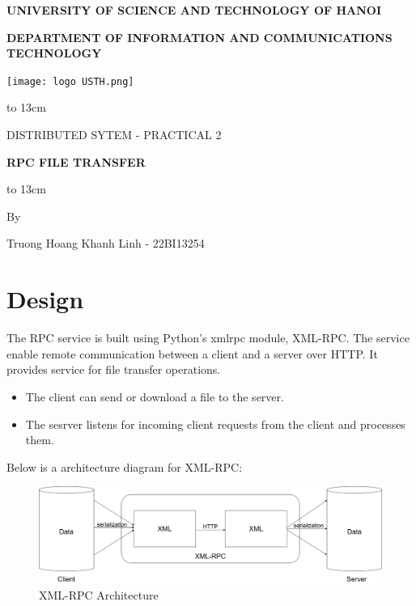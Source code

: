 \documentclass[12pt]{article}
\begin{document}
\begin{titlepage}
   \begin{center}

       \textbf{UNIVERSITY OF SCIENCE AND TECHNOLOGY OF HANOI}

       \footnotesize{\textbf{DEPARTMENT OF INFORMATION AND COMMUNICATIONS TECHNOLOGY}}
       
       \texttt{[image: logo USTH.png]}
            
       \vspace{6cm}
       
       \centerline{\hbox to 13cm{\hrulefill}}
       \vspace{-0.1cm}
       {\sc 
       \uppercase{{Distributed Sytem - Practical 2}}

       \vspace{0.1cm}

       \LARGE
       \uppercase{{\textbf{RPC File Transfer}}}}
       \centerline{\hbox to 13cm{\hrulefill}}

       \vspace{9cm}

       By

       Truong Hoang Khanh Linh - 22BI13254
            
   \end{center}
\end{titlepage}

\section{Design}

The RPC service is built using Python’s xmlrpc module, XML-RPC. The service enable remote communication between a client and a server over HTTP. It provides service for file transfer operations.
\begin{itemize}
    \item The client can send or download a file to the server.
    \item The sesrver listens for incoming client requests from the client and processes them.
\end{itemize}

Below is a architecture diagram for XML-RPC:
\begin{figure}[!ht]
\centering
\includegraphics[scale=0.3]{xml-rpc-architecture.png}
\caption{XML-RPC Architecture}
\end{figure}
\end{document}
